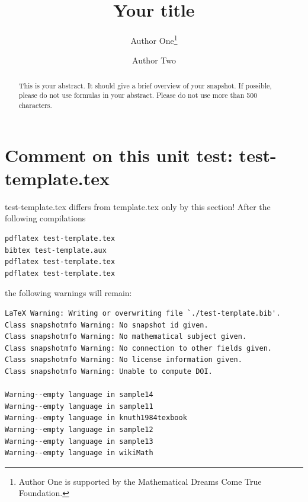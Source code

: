 \documentclass{snapshotmfo}
\author{Author One\thanks{Author One is supported by the Mathematical Dreams Come True Foundation.} \and Author Two}
\title{Your title}
\begin{document}

\begin{abstract}
This is your abstract. It should give a brief overview of your snapshot. If possible, please do not use formulas in your abstract. Please do not use more than 500 characters.
\end{abstract}

\section{Comment on this unit test: test-template.tex}
test-template.tex differs from template.tex only by this section!
After the following compilations
\begin{verbatim}
pdflatex test-template.tex
bibtex test-template.aux
pdflatex test-template.tex
pdflatex test-template.tex
\end{verbatim}
the following warnings will remain:
\begin{verbatim}
LaTeX Warning: Writing or overwriting file `./test-template.bib'.
Class snapshotmfo Warning: No snapshot id given.
Class snapshotmfo Warning: No mathematical subject given.
Class snapshotmfo Warning: No connection to other fields given.
Class snapshotmfo Warning: No license information given.
Class snapshotmfo Warning: Unable to compute DOI.

Warning--empty language in sample14
Warning--empty language in sample11
Warning--empty language in knuth1984texbook
Warning--empty language in sample12
Warning--empty language in sample13
Warning--empty language in wikiMath
\end{verbatim}
\end{document}
